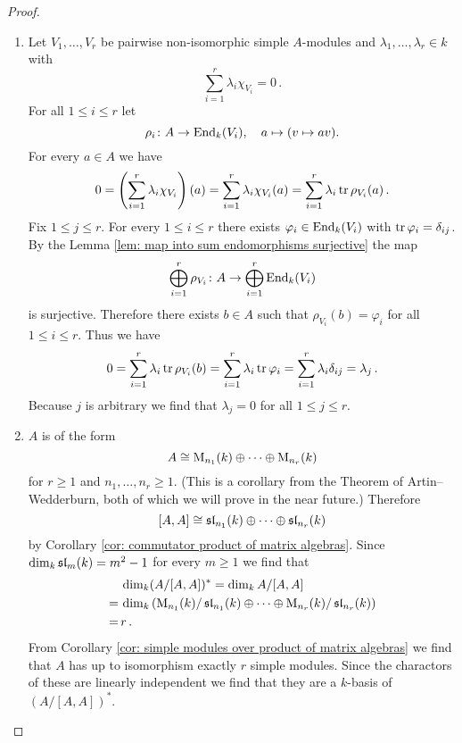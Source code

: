 \begin{proof}
  \begin{enumerate}[label=\emph{\alph*)},leftmargin=*]
    \item
      Let $V_1, \dotsc, V_r$ be pairwise non-isomorphic simple $A$-modules and $\lambda_1, \dotsc, \lambda_r \in k$ with
      \[
          \sum_{i=1}^r \lambda_i \chi_{V_i}
        = 0 \,.
      \]
      For all $1 \leq i \leq r$ let
      \[
                \rho_i
        \colon  A
        \to     \operatorname{End}_k(V_i),
        \quad   a
        \mapsto (v \mapsto av).
      \]
      For every $a \in A$ we have
      \[
          0
        = \left( \sum_{i=1}^r \lambda_i \chi_{V_i} \right)(a)
        = \sum_{i=1}^r \lambda_i \chi_{V_i}(a)
        = \sum_{i=1}^r \lambda_i \operatorname{tr} \rho_{V_i}(a) \,.
      \]
      Fix $1 \leq j \leq r$.
      For every $1 \leq i \leq r$ there exists $\varphi_i \in \operatorname{End}_k(V_i)$ with $\operatorname{tr} \varphi_i = \delta_{ij}$.
      By the Lemma \ref{lem: map into sum endomorphisms surjective} the map
      \[
                \bigoplus_{i=1}^r \rho_{V_i}
        \colon  A
        \to     \bigoplus_{i=1}^r \operatorname{End}_k(V_i)
      \]
      is surjective.
      Therefore there exists $b \in A$ such that $\rho_{V_i}(b) = \varphi_i$ for all $1 \leq i \leq r$.
      Thus we have
      \[
          0
        = \sum_{i=1}^r \lambda_i \operatorname{tr} \rho_{V_i}(b)
        = \sum_{i=1}^r \lambda_i \operatorname{tr} \varphi_i
        = \sum_{i=1}^r \lambda_i \delta_{ij}
        = \lambda_j \,.
      \]
      Because $j$ is arbitrary we find that $\lambda_j = 0$ for all $1 \leq j \leq r$.
    \item
      $A$ is of the form 
      \[
        A \cong \operatorname{M}_{n_1}(k) \oplus \dotsb \oplus \operatorname{M}_{n_r}(k)
      \]
      for $r \geq 1$ and $n_1, \dotsc, n_r \geq 1$.
      (This is a corollary from the Theorem of Artin--Wedderburn, both of which we will prove in the near future.) Therefore
      \[
        [A,A] \cong \operatorname{\mathfrak{sl}}_{n_1}(k) \oplus \dotsb \oplus \operatorname{\mathfrak{sl}}_{n_r}(k)
      \]
      by Corollary \ref{cor: commutator product of matrix algebras}.
      Since $\dim_k \operatorname{\mathfrak{sl}}_m(k) = m^2 - 1$ for every $m \geq 1$ we find that
      \begin{align*}
         &\,  \dim_k (A/[A,A])^*
        =     \dim_k A/[A,A] \\
        =&\,  \dim_k\left(
                              \operatorname{M}_{n_1}(k) / \operatorname{\mathfrak{sl}}_{n_1}(k)
                      \oplus  \dotsb
                      \oplus  \operatorname{M}_{n_r}(k) / \operatorname{\mathfrak{sl}}_{n_r}(k)
                    \right) \\
        =&\,  r \,.
      \end{align*}
      From Corollary \ref{cor: simple modules over product of matrix algebras} we find that $A$ has up to isomorphism exactly $r$ simple modules.
      Since the charactors of these are linearly independent we find that they are a $k$-basis of $(A/[A,A])^*$.
    \qedhere
  \end{enumerate}
\end{proof}


